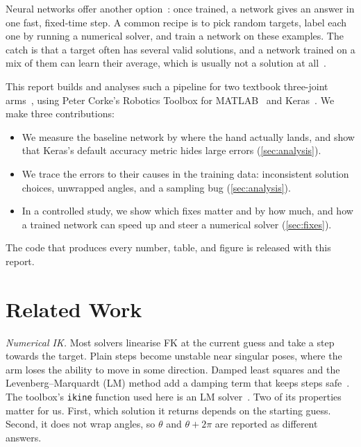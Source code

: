 \documentclass[conference]{IEEEtran}
\newcommand{\code}[1]{\texttt{#1}}
\begin{document}
Neural networks offer another option~\cite{guez1988solution,dsouza2001learning,csiszar2017solving}: once trained, a network gives an answer in one fast, fixed-time step. A common recipe is to pick random targets, label each one by running a numerical solver, and train a network on these examples. The catch is that a target often has several valid solutions, and a network trained on a mix of them can learn their average, which is usually not a solution at all~\cite{jordan1992forward}.

This report builds and analyses such a pipeline for two textbook three-joint arms~\cite{siciliano2009robotics}, using Peter Corke's Robotics Toolbox for MATLAB~\cite{corke1996toolbox,corke2017rvc} and Keras~\cite{chollet2015keras}. We make three contributions:
\begin{itemize}
\item We measure the baseline network by where the hand actually lands, and show that Keras's default accuracy metric hides large errors (\cref{sec:analysis}).
\item We trace the errors to their causes in the training data: inconsistent solution choices, unwrapped angles, and a sampling bug (\cref{sec:analysis}).
\item In a controlled study, we show which fixes matter and by how much, and how a trained network can speed up and steer a numerical solver (\cref{sec:fixes}).
\end{itemize}
The code that produces every number, table, and figure is released with this report.

\section{Related Work}

\emph{Numerical IK.} Most solvers linearise FK at the current guess and take a step towards the target. Plain steps become unstable near singular poses, where the arm loses the ability to move in some direction. Damped least squares and the Levenberg--Marquardt (LM) method add a damping term that keeps steps safe~\cite{wampler1986manipulator,nakamura1986inverse,levenberg1944method,marquardt1963algorithm,sugihara2011solvability}. The toolbox's \code{ikine} function used here is an LM solver~\cite{corke2017rvc}. Two of its properties matter for us. First, which solution it returns depends on the starting guess. Second, it does not wrap angles, so $\theta$ and $\theta+2\pi$ are reported as different answers.
\end{document}
